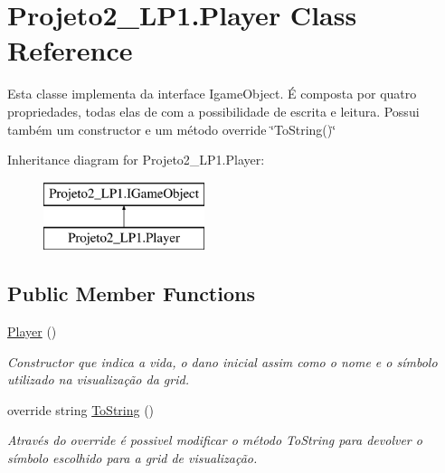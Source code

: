\hypertarget{class_projeto2___l_p1_1_1_player}{}\section{Projeto2\+\_\+\+L\+P1.\+Player Class Reference}
\label{class_projeto2___l_p1_1_1_player}


Esta classe implementa da interface Igame\+Object. É composta por quatro propriedades, todas elas de com a possibilidade de escrita e leitura. Possui também um constructor e um método override \char`\"{}\+To\+String()\char`\"{}  


Inheritance diagram for Projeto2\+\_\+\+L\+P1.\+Player\+:\begin{figure}[H]
\begin{center}
\leavevmode
\includegraphics[height=2.000000cm]{class_projeto2___l_p1_1_1_player}
\end{center}
\end{figure}
\subsection*{Public Member Functions}
\begin{DoxyCompactItemize}
\item 
\mbox{\hyperlink{class_projeto2___l_p1_1_1_player_a36e68b67c7dae2744bf816c124c78e4e}{Player}} ()
\begin{DoxyCompactList}\small\item\em Constructor que indica a vida, o dano inicial assim como o nome e o símbolo utilizado na visualização da grid. \end{DoxyCompactList}\item 
override string \mbox{\hyperlink{class_projeto2___l_p1_1_1_player_a3092133d59ed9886d2d47a661740f779}{To\+String}} ()
\begin{DoxyCompactList}\small\item\em Através do override é possivel modificar o método To\+String para devolver o símbolo escolhido para a grid de visualização. \end{DoxyCompactList}\end{DoxyCompactItemize}
